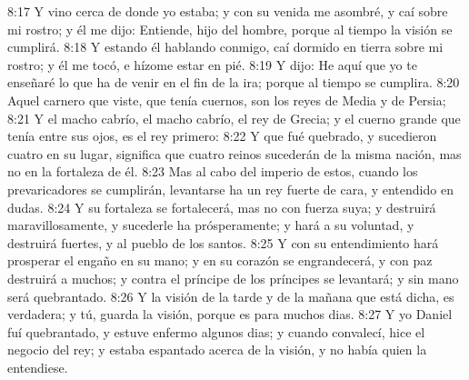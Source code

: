 8:17 Y vino cerca de donde yo estaba; y con su venida me asombré, y caí sobre mi rostro; y él me dijo: Entiende, hijo del hombre, porque al tiempo la visión se cumplirá.
8:18 Y estando él hablando conmigo, caí dormido en tierra sobre mi rostro; y él me tocó, e hízome estar en pié.
8:19 Y dijo: He aquí que yo te enseñaré lo que ha de venir en el fin de la ira; porque al tiempo se cumplira.
8:20 Aquel carnero que viste, que tenía cuernos, son los reyes de Media y de Persia;
8:21 Y el macho cabrío, el macho cabrío, el rey de Grecia; y el cuerno grande que tenía entre sus ojos, es el rey primero:
8:22 Y que fué quebrado, y sucedieron cuatro en su lugar, significa que cuatro reinos sucederán de la misma nación, mas no en la fortaleza de él.
8:23 Mas al cabo del imperio de estos, cuando los prevaricadores se cumplirán, levantarse ha un rey fuerte de cara, y entendido en dudas.
8:24 Y su fortaleza se fortalecerá, mas no con fuerza suya; y destruirá maravillosamente, y sucederle ha prósperamente; y hará a su voluntad, y destruirá fuertes, y al pueblo de los santos.
8:25 Y con su entendimiento hará prosperar el engaño en su mano; y en su corazón se engrandecerá, y con paz destruirá a muchos; y contra el príncipe de los príncipes se levantará; y sin mano será quebrantado.
8:26 Y la visión de la tarde y de la mañana que está dicha, es verdadera; y tú, guarda la visión, porque es para muchos dias.
8:27 Y yo Daniel fuí quebrantado, y estuve enfermo algunos dias; y cuando convalecí, hice el negocio del rey; y estaba espantado acerca de la visión, y no había quien la entendiese.

